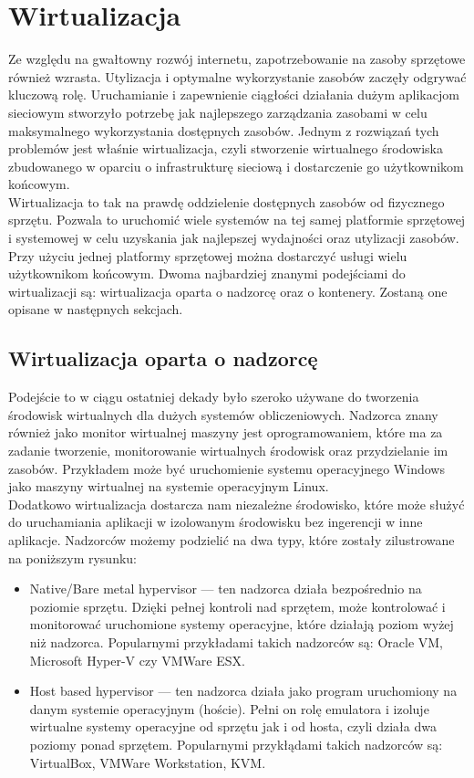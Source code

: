 \documentclass[12pt]{report}
\let\Oldsection\section
\renewcommand{\section}{\FloatBarrier\Oldsection}
\let\Oldsubsection\subsection
\renewcommand{\subsection}{\FloatBarrier\Oldsubsection}
\begin{document}
\section{Wirtualizacja}
Ze względu na gwałtowny rozwój internetu, zapotrzebowanie na zasoby sprzętowe również wzrasta. Utylizacja i optymalne wykorzystanie zasobów zaczęły odgrywać kluczową rolę. Uruchamianie i zapewnienie ciągłości działania dużym aplikacjom sieciowym stworzyło potrzebę jak najlepszego zarządzania zasobami w celu maksymalnego wykorzystania dostępnych zasobów. Jednym z rozwiązań tych problemów jest właśnie wirtualizacja, czyli stworzenie wirtualnego środowiska zbudowanego w oparciu o infrastrukturę sieciową i dostarczenie go użytkownikom końcowym. \\
\indent Wirtualizacja to tak na prawdę oddzielenie dostępnych zasobów od fizycznego sprzętu. Pozwala to uruchomić wiele systemów na tej samej platformie sprzętowej i systemowej w celu uzyskania jak najlepszej wydajności oraz utylizacji zasobów. Przy użyciu jednej platformy sprzętowej można dostarczyć usługi wielu użytkownikom końcowym. Dwoma najbardziej znanymi podejściami do wirtualizacji są: wirtualizacja oparta o nadzorcę oraz o kontenery. Zostaną one opisane w następnych sekcjach.

\subsection{Wirtualizacja oparta o nadzorcę}
Podejście to w ciągu ostatniej dekady było szeroko używane do tworzenia środowisk wirtualnych dla dużych systemów obliczeniowych. Nadzorca znany również jako monitor wirtualnej maszyny jest oprogramowaniem, które ma za zadanie tworzenie, monitorowanie wirtualnych środowisk oraz przydzielanie im zasobów. Przykładem może być uruchomienie systemu operacyjnego Windows jako maszyny wirtualnej na systemie operacyjnym Linux. \\
\indent Dodatkowo wirtualizacja dostarcza nam niezależne środowisko, które może służyć do uruchamiania aplikacji w izolowanym środowisku bez ingerencji w inne aplikacje. Nadzorców możemy podzielić na dwa typy, które zostały zilustrowane na poniższym rysunku:

\begin{itemize}
\item Native/Bare metal hypervisor --- ten nadzorca działa bezpośrednio na poziomie sprzętu. Dzięki pełnej kontroli nad sprzętem, może kontrolować i monitorować uruchomione systemy operacyjne, które działają poziom wyżej niż nadzorca. Popularnymi przykładami takich nadzorców są: Oracle VM, Microsoft Hyper-V czy VMWare ESX.
\item Host based hypervisor --- ten nadzorca działa jako program uruchomiony na danym systemie operacyjnym (hoście). Pełni on rolę emulatora i izoluje wirtualne systemy operacyjne od sprzętu jak i od hosta, czyli działa dwa poziomy ponad sprzętem. Popularnymi przykłądami takich nadzorców są: VirtualBox, VMWare Workstation, KVM.
\end{itemize}
\end{document}
